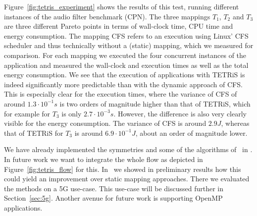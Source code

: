 Figure~\ref{fig:tetris_experiment} shows the results of this test, running different instances of the audio filter benchmark (\ac{CPN}).
The three mappings $T_1$, $T_2$ and $T_3$ are three different Pareto points in terms of wall-clock time, CPU time and energy consumption. 
The mapping \ac{CFS} refers to an execution using Linux' \ac{CFS} scheduler and thus technically without a (static) mapping, which we measured for comparison.
For each mapping we executed the four concurrent instances of the application and measured the wall-clock and execution times as well as the total energy consumption.
We see that the execution of applications with \ac{TETRiS} is indeed significantly more predictable than with the dynamic approach of \ac{CFS}.
This is especially clear for the execution times, where the variance of \ac{CFS} of around $1.3 \cdot 10^{-1} s$ is two orders of magnitude higher than that of \ac{TETRiS}, which for example for $T_3$ is only  $2.7 \cdot 10^{-3}s$.
However, the difference is also very clearly visible for the energy consumption. The variance of \ac{CFS} is around $2.9 J$, whereas that of \ac{TETRiS} for $T_3$ is around $6.9 \cdot 10^{-1} J$, about an order of magnitude lower.

We have already implemented the symmetries and some of the algorithms of~\cite{khasanov_date20} in \mocasin.
 In future work we want to integrate the whole flow as depicted in Figure~\ref{fig:tetris_flow} for this.
In~\cite{menard_rapido21} we showed in preliminary results how this could yield an improvement over static mapping approaches.
There we evaluated the methods on a 5G use-case. This use-case will be discussed further in Section~\ref{sec:5g}.
Another avenue for future work is supporting OpenMP applications.

